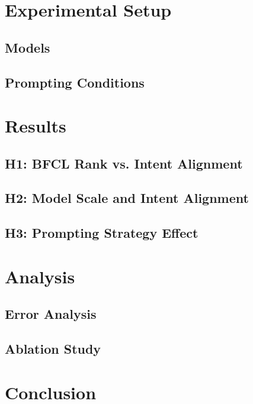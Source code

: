 \documentclass{article}
\begin{document}
\section{Experimental Setup}
\subsection{Models}
\subsection{Prompting Conditions}

\section{Results}

\subsection{H1: BFCL Rank vs. Intent Alignment}
\subsection{H2: Model Scale and Intent Alignment}
\subsection{H3: Prompting Strategy Effect}

\section{Analysis}
\subsection{Error Analysis}
\subsection{Ablation Study}

\section{Conclusion}
\end{document}
